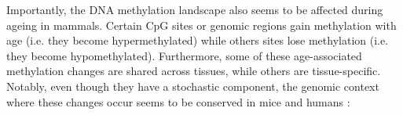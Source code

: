 Importantly, the DNA methylation landscape also seems to be affected during ageing in mammals. Certain CpG sites or genomic regions gain methylation with age (i.e. they become hypermethylated) while others sites lose methylation (i.e. they become hypomethylated). Furthermore, some of these age-associated methylation changes are shared across tissues, while others are tissue-specific. Notably, even though they have a stochastic component, the genomic context where these changes occur seems to be conserved in mice \citep{Maegawa2010,Avrahami2015,Wang2017,Cole2017,Sziraki2018} and humans \citep{Rakyan2010,Teschendorff2010,Horvath2012,Heyn2012,Day2013,Raddatz2013,Weidner2014,Fernandez2015,Dozmorov2015,Yuan2015,Slieker2016,Slieker2018,Zhu2018}:

\begin{itemize}
	

\end{itemize}
